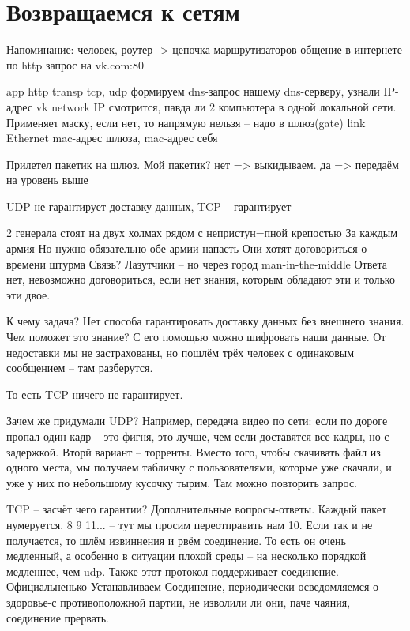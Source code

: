\section{Возвращаемся к сетям}%
Напоминание:
человек, роутер -> цепочка маршрутизаторов
общение в интернете по http
запрос на vk.com:80

app		http
transp		tcp, udp		формируем dns-запрос нашему dns-серверу, узнали IP-адрес vk
network		IP			смотрится, павда ли 2 компьютера в одной локальной сети. Применяет маску, если нет, то напрямую нельзя -- надо в шлюз(gate)
link		Ethernet		mac-адрес шлюза, mac-адрес себя


Прилетел пакетик на шлюз. Мой пакетик? нет => выкидываем. да => передаём на уровень выше





UDP не гарантирует доставку данных, TCP -- гарантирует

2 генерала стоят на двух холмах рядом с непристун=пной крепостью
За каждым армия
Но нужно обязательно обе армии напасть
Они хотят договориться о времени штурма
Связь?
Лазутчики -- но через город
man-in-the-middle
Ответа нет, невозможно договориться, если нет знания, которым обладают эти и только эти двое.

К чему задача? Нет способа гарантировать доставку данных без внешнего знания.
Чем поможет это знание? С его помощью можно шифровать наши данные.
От недоставки мы не застрахованы, но пошлём трёх человек с одинаковым сообщением -- там разберутся.

То есть TCP ничего не гарантирует.

Зачем же придумали UDP? Например, передача видео по сети: если по дороге пропал один кадр -- это фигня, это лучше, чем если доставятся все кадры, но с задержкой. 
Вторй вариант -- торренты. Вместо того, чтобы скачивать файл из одного места, мы получаем табличку с пользователями, которые уже скачали, и уже у них по небольшому кусочку тырим. Там можно повторить запрос.

TCP -- засчёт чего гарантии? Дополнительные вопросы-ответы. Каждый пакет нумеруется. 8 9 11... -- тут мы просим переотправить нам 10. Если так и не получается, то шлём извиннения и рвём соединение. То есть он очень медленный, а особенно в ситуации плохой среды -- на несколько порядкой медленнее, чем udp. 
Также этот протокол поддерживает соединение. Официальненько Устанавливаем Соединение, периодически осведомляемся о здоровье-с противоположной партии, не изволили ли они, паче чаяния, соединение прервать. %




